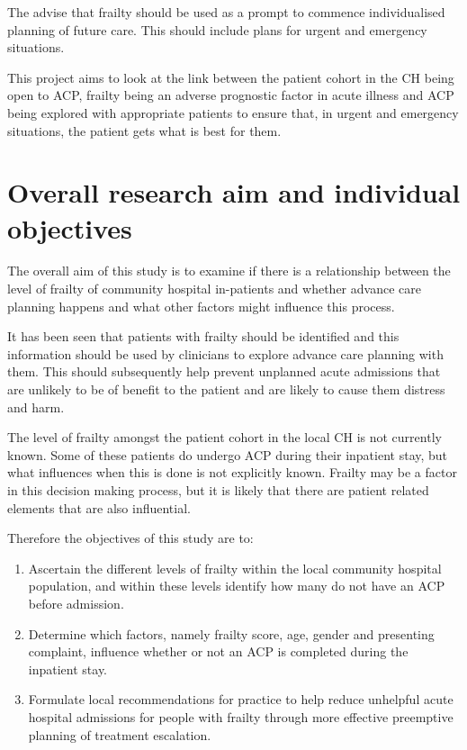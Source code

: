 \documentclass
[
	12pt,
	a4paper,
	oneside,
]{report}
\begin{document}
The \textcite{bgs:14} advise that frailty should be used as a prompt to
commence individualised planning of future care. This should include plans
for urgent and emergency situations.

This project aims to look at the link between the patient cohort in the CH
being open to ACP, frailty being an adverse prognostic factor in acute illness 
and
ACP being explored with appropriate patients to ensure that, in urgent and 
emergency situations, the patient gets what is best for them.

\section{Overall research aim and individual objectives}

The overall aim of this study is to examine if there is a relationship 
between the 
level of frailty of community hospital in-patients and whether advance care planning
happens and what other factors might influence this process.

It has been seen that patients with frailty should be identified and this 
information should be used by clinicians to explore advance care planning with 
them.
This should subsequently help prevent unplanned acute admissions that are 
unlikely to be of benefit to the patient and are likely to cause them distress 
and harm.

The level of frailty amongst the patient cohort in the local CH is not currently
known. Some of these patients do undergo ACP during their inpatient stay, but what 
influences when this is done is not explicitly known. Frailty may be a factor
in this decision making process, but it is likely that there are patient 
related elements that are also influential.

Therefore the objectives of this study are to:
\begin{enumerate}
\item	Ascertain the different levels of frailty within the local 
		community hospital population, and within these levels identify 
		how many do not have an ACP before admission.\label{obj:prevalence}
\item	Determine which factors, namely frailty score, age, gender and
		presenting complaint, influence whether or not an ACP is 
		completed during the inpatient stay.\label{obj:association}
\item	Formulate local recommendations for practice to help reduce unhelpful
		acute hospital admissions for people with frailty through more 
		effective preemptive planning of treatment escalation.
		\label{obj:recommend}
\end{enumerate}
\end{document}
